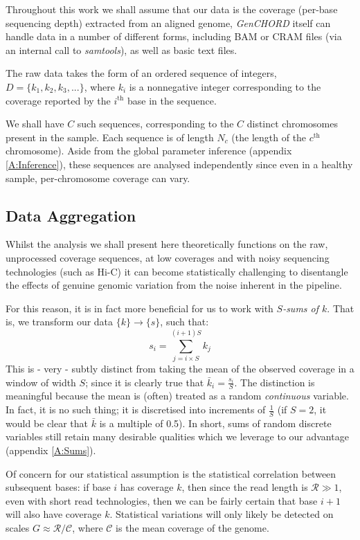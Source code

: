 \documentclass[fleqn,usenatbib]{mnras}
\def\codename{\textit{GenCHORD}}
\begin{document}
			Throughout this work we shall assume that our data is the coverage (per-base sequencing depth) extracted from an aligned genome, \codename{} itself can handle data in a number of different forms, including BAM or CRAM files (via an internal call to \textit{samtools}), as well as basic text files. 
			
			The raw data takes the form of an ordered sequence of integers, $D = \{k_1,k_2,k_3,...\}$, where $k_i$ is a nonnegative integer corresponding to the coverage reported by the $i^\text{th}$ base in the sequence.
			
			We shall have $C$ such sequences, corresponding to the $C$ {distinct} chromosomes present in the sample. Each sequence is of length $N_c$ (the length of the $c^\text{th}$ chromosome). Aside from the global parameter inference (appendix \ref{A:Inference}), these sequences are analysed independently since even in a healthy sample, per-chromosome coverage can vary.
	
		\subsection{Data Aggregation}

			Whilst the analysis we shall present here theoretically functions on the raw, unprocessed coverage sequences, at low coverages and with noisy sequencing technologies (such as Hi-C) it can become statistically challenging to disentangle the effects of genuine genomic variation from the noise inherent in the pipeline. 

			For this reason, it is in fact more beneficial for us to work with \textit{$S$-sums of $k$}. That is, we transform our data $\{k\} \to \{s\}$, such that:
			\begin{equation}
				s_i = \sum_{j=i \times S}^{(i+1)S} k_{j}
			\end{equation}
			This is - very - subtly distinct from taking the mean of the observed coverage in a window of width $S$; since it is clearly true that $\bar{k}_i = \frac{s_i}{S}$. The distinction is meaningful because the mean is (often) treated as a random \textit{continuous} variable. In fact, it is no such thing; it is discretised into increments of $\frac{1}{S}$ (if $S = 2$, it would be clear that $\bar{k}$ is a multiple of 0.5). In short, sums of random discrete variables still retain many desirable qualities which we leverage to our advantage (appendix \ref{A:Sums}).

			Of concern for our statistical assumption is the statistical correlation between subsequent bases: if base $i$ has coverage $k$, then since the read length is $\mathcal{R}\gg 1$, even with short read technologies, then we can be fairly certain that base $i+1$ will also have coverage $k$. Statistical variations will only likely be detected on scales $G \approx \mathcal{R}/\mathcal{C}$, where $\mathcal{C}$ is the mean coverage of the genome. 
\end{document}
